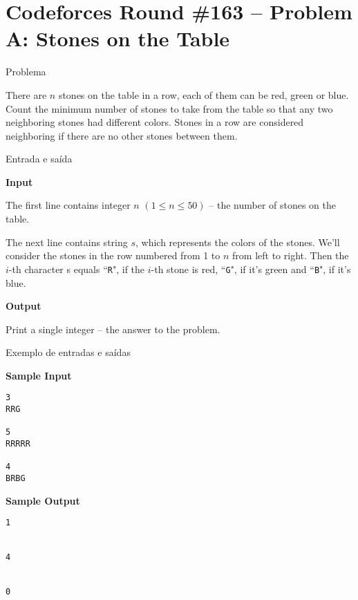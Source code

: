 \section{Codeforces Round \#163 -- Problem A: Stones on the Table}

\begin{frame}[fragile]{Problema}

There are $n$ stones on the table in a row, each of them can be red, green or blue. Count the minimum number of stones to take from the table so that any two neighboring stones had different colors. Stones in a row are considered neighboring if there are no other stones between them.

\end{frame}

\begin{frame}[fragile]{Entrada e saída}

\textbf{Input}

The first line contains integer $n$ $(1\leq n\leq 50)$ -- the number of stones on the table.

The next line contains string $s$, which represents the colors of the stones. We'll consider the 
stones in the row numbered from 1 to $n$ from left to right. Then the $i$-th character s equals 
``\texttt{R}", if the $i$-th stone is red, ``\texttt{G}", if it's green and ``\texttt{B}", 
if it's blue.

\textbf{Output}

Print a single integer -- the answer to the problem.

\end{frame}

\begin{frame}[fragile]{Exemplo de entradas e saídas}

\begin{minipage}[t]{0.5\textwidth}
\textbf{Sample Input}
\begin{verbatim}
3
RRG

5
RRRRR

4
BRBG
\end{verbatim}
\end{minipage}
\begin{minipage}[t]{0.45\textwidth}
\textbf{Sample Output}
\begin{verbatim}
1


4


0
\end{verbatim}
\end{minipage}
\end{frame}

